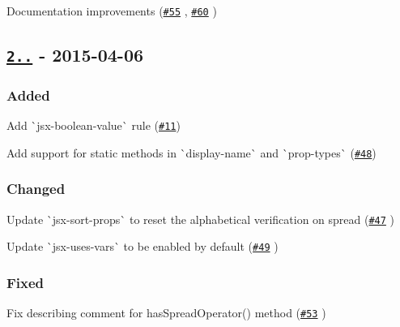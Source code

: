 \begin{DoxyItemize}
\item Documentation improvements (\href{https://github.com/yannickcr/eslint-plugin-react/pull/55}{\tt \#55} , \href{https://github.com/yannickcr/eslint-plugin-react/pull/60}{\tt \#60} )
\end{DoxyItemize}

\subsection*{\href{https://github.com/yannickcr/eslint-plugin-react/compare/v2.0.2...v2.1.0}{\tt 2..} -\/ 2015-\/04-\/06}

\subsubsection*{Added}


\begin{DoxyItemize}
\item Add \`{}jsx-\/boolean-\/value\`{} rule (\href{https://github.com/yannickcr/eslint-plugin-react/issues/11}{\tt \#11})
\item Add support for static methods in \`{}display-\/name\`{} and \`{}prop-\/types\`{} (\href{https://github.com/yannickcr/eslint-plugin-react/issues/48}{\tt \#48})
\end{DoxyItemize}

\subsubsection*{Changed}


\begin{DoxyItemize}
\item Update \`{}jsx-\/sort-\/props\`{} to reset the alphabetical verification on spread (\href{https://github.com/yannickcr/eslint-plugin-react/pull/47}{\tt \#47} )
\item Update \`{}jsx-\/uses-\/vars\`{} to be enabled by default (\href{https://github.com/yannickcr/eslint-plugin-react/pull/49}{\tt \#49} )
\end{DoxyItemize}

\subsubsection*{Fixed}


\begin{DoxyItemize}
\item Fix describing comment for has\+Spread\+Operator() method (\href{https://github.com/yannickcr/eslint-plugin-react/pull/53}{\tt \#53} )
\end{DoxyItemize}

